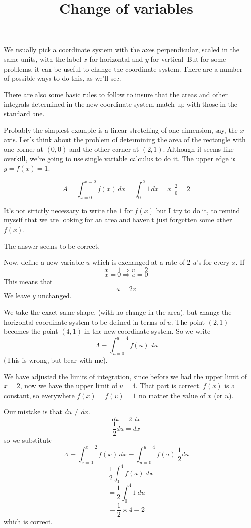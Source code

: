 \documentclass[11pt, oneside]{article}
\title{Change of variables}
\date{}
\begin{document}
\maketitle
\Large

\label{sec:Change_of_variables}

We usually pick a coordinate system with the axes perpendicular, scaled in the same units, with the label $x$ for horizontal and $y$ for vertical.  But for some problems, it can be useful to change the coordinate system.  There are a number of possible ways to do this, as we'll see.  

There are also some basic rules to follow to insure that the areas and other integrals determined in the new coordinate system match up with those in the standard one.

Probably the simplest example is a linear stretching of one dimension, say, the $x$-axis.  Let's think about the problem of determining the area of the rectangle with one corner at $(0,0)$ and the other corner at $(2,1)$.  Although it seems like overkill, we're going to use single variable calculus to do it.  The upper edge is $y = f(x) = 1$.

\[ A = \int_{x=0}^{x=2} f(x)\ dx = \int_0^2 1\ dx = x  \ \bigg |_{0}^{2} = 2 \]

It's not strictly necessary to write the $1$ for $f(x)$ but I try to do it, to remind myself that we are looking for an area and haven't just forgotten some other $f(x)$.

The answer seems to be correct.

Now, define a new variable $u$ which is exchanged at a rate of 2 $u$'s for every $x$.  If 
\[ x = 1\Rightarrow u = 2 \]
\[ x = 0\Rightarrow u = 0 \]
This means that 
\[ u  = 2x \]
We leave $y$ unchanged.

We take the exact same shape, (with no change in the area), but change the horizontal coordinate system to be defined in terms of $u$.  The point $(2,1)$ becomes the point $(4,1)$ in the new coordinate system.  So we write
\[ A = \int_{u=0}^{u=4} f(u)\ du  \]
(This is wrong, but bear with me).  

We have adjusted the limits of integration, since before we had the upper limit of $x=2$, now we have the upper limit of $u=4$.  That part is correct.  $f(x)$ is a constant, so everywhere $f(x) = f(u) = 1$ no matter the value of $x$ (or $u$).

Our mistake is that $du \neq dx$.
\[ du = 2\ dx \]
\[ \frac{1}{2} du = dx \]
so we substitute
\[ A = \int_{x=0}^{x=2} f(x)\ dx =  \int_{u=0}^{u=4} f(u)\ \frac{1}{2}du \]
\[ =  \frac{1}{2} \int_0^4 f(u)\ du \]
\[ = \frac{1}{2} \int_0^4 1\ du \]
\[ =  \frac{1}{2} \times 4 = 2 \]
which is correct.
\end{document}

